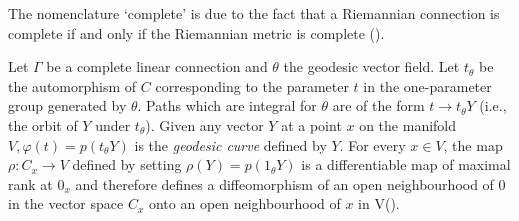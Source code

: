 The nomenclature `complete' is due to the fact that a Riemannian
connection is complete if and only if the Riemannian metric is
complete (\cite{27}). 

Let $\Gamma$ be a complete linear connection and $\theta$ the geodesic
vector field. Let $t_\theta$ be the automorphism of $C$ corresponding
to the parameter $t$ in the one-parameter group generated by
$\theta$. Paths which are integral for $\theta$ are of the form $t \to
t_\theta Y$ (i.e., the orbit of $Y$ under $t_\theta$). Given any
vector $Y$ at a point $x$ on the manifold $V, \varphi (t) = p(t_\theta
Y)$ is the \textit{geodesic curve} defined by $Y$. 
For every $x \in V$, the map $\rho : C_x \to V$ defined by setting
$\rho (Y) = p(1_\theta Y)$ is a differentiable map of maximal rank at
$0_x$ and  therefore defines a diffeomorphism of an open neighbourhood
of $0$ in the vector space $C_x$  onto an open neighbourhood of $x$ in
V(\cite{26}). 
